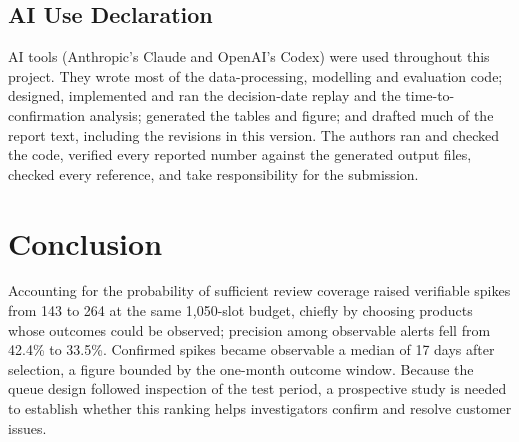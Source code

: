 \documentclass[conference]{IEEEtran}
\begin{document}
\subsection{AI Use Declaration}
AI tools (Anthropic's Claude and OpenAI's Codex) were used throughout this project. They wrote most of the data-processing, modelling and evaluation code; designed, implemented and ran the decision-date replay and the time-to-confirmation analysis; generated the tables and figure; and drafted much of the report text, including the revisions in this version. The authors ran and checked the code, verified every reported number against the generated output files, checked every reference, and take responsibility for the submission.

\section{Conclusion}
Accounting for the probability of sufficient review coverage raised verifiable spikes from 143 to 264 at the same 1,050-slot budget, chiefly by choosing products whose outcomes could be observed; precision among observable alerts fell from 42.4\% to 33.5\%. Confirmed spikes became observable a median of 17 days after selection, a figure bounded by the one-month outcome window. Because the queue design followed inspection of the test period, a prospective study is needed to establish whether this ranking helps investigators confirm and resolve customer issues.
\end{document}

